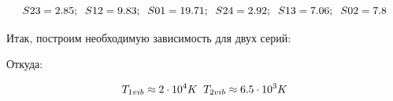 \begin{figure}[h!]
	\label{fig:image}
\end{figure}

\begin{displaymath}
S23 =  2.85;\hspace{2mm}
S12 =  9.83;\hspace{2mm}
S01 =  19.71;\hspace{2mm}
S24 =  2.92;\hspace{2mm}
S13 =  7.06;\hspace{2mm}
S02 =  7.8
\end{displaymath}

\newpage

Итак, построим необходимую зависимость для двух серий:

\begin{figure}[h!]
	\label{fig:image}
\end{figure}

Откуда:

\begin{displaymath}
T_{1vib} \approx 2\cdot 10^4 K \hspace{2mm} T_{2vib} \approx 6.5\cdot 10^3 K
\end{displaymath}

